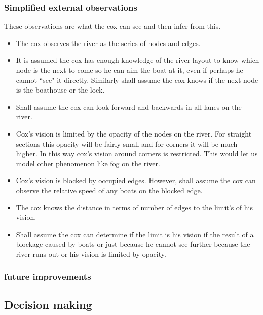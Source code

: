       \subsubsection{Simplified external observations}
      These observations are what the cox can see and then infer from this.
      \begin{itemize}
        \item The cox observes the river as the series of nodes and edges.
        \item It is assumed the cox has enough knowledge of the river layout to know which node is the next to come so he can aim the boat at it, even if perhaps he cannot ``see" it directly. Similarly shall assume the cox knows if the next node is the boathouse or the lock.
        \item Shall assume the cox can look forward and backwards in all lanes on the river.
        \item Cox's vision is limited by the opacity of the nodes on the river. For straight sections this opacity will be fairly small and for corners it will be much higher. In this way cox's vision around corners is restricted. This would let us model other phenomenon like fog on the river.
        \item Cox's vision is blocked by occupied edges. However, shall assume the cox can observe the relative speed of any boats on the blocked edge.
        \item The cox knows the distance in terms of number of edges to the limit's of his vision.
        \item Shall assume the cox can determine if the limit is his vision if the result of a blockage caused by boats or just because he cannot see further because the river runs out or his vision is limited by opacity.
      \end{itemize}
      
      \subsubsection{future improvements}
      
      
      \subsection{Decision making}
